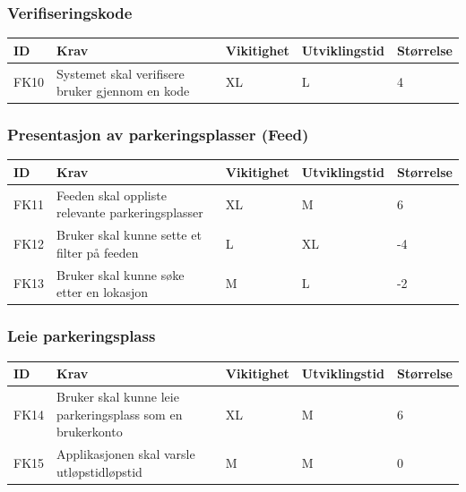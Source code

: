 \documentclass[12pt]{article}
\newcommand{\cellr}{\cellcolor{red!25}}
\newcommand{\cello}{\cellcolor{orange!25}}
\newcommand{\celly}{\cellcolor{yellow!25}}
\newcommand{\cellg}{\cellcolor{green!25}}
\begin{document}
        \subsubsection{Verifiseringskode}
        
        \begin{tabular}{|p{2cm}|p{6cm}|
            >{\centering\arraybackslash}p{2cm}|
            >{\centering\arraybackslash}p{2cm}|
            >{\centering\arraybackslash}p{2cm}|} 
            \hline
            \bf ID & \bf Krav & \bf Vikitighet & \bf Utviklingstid & \bf Størrelse\\
            \hline
            FK10
            &
            Systemet skal verifisere bruker gjennom en kode
            & XL & L & \cellg 4\\
            \hline
        \end{tabular}
        
        \subsubsection{Presentasjon av parkeringsplasser (Feed)}
        
        \begin{tabular}{|p{2cm}|p{6cm}|
            >{\centering\arraybackslash}p{2cm}|
            >{\centering\arraybackslash}p{2cm}|
            >{\centering\arraybackslash}p{2cm}|} 
            \hline
            \bf ID & \bf Krav & \bf Vikitighet & \bf Utviklingstid & \bf Størrelse\\
            \hline
            FK11
            &
            Feeden skal oppliste relevante parkeringsplasser
            & XL & M & \cellg 6\\
            \hline
            FK12
            &
            Bruker skal kunne sette et filter på feeden
            & L & XL & \cellr -4\\
            \hline
            FK13
            &
            Bruker skal kunne søke etter en lokasjon
            & M & L & \cello -2\\
            \hline
        \end{tabular}
        
        \subsubsection{Leie parkeringsplass}
        
        \begin{tabular}{|p{2cm}|p{6cm}|
            >{\centering\arraybackslash}p{2cm}|
            >{\centering\arraybackslash}p{2cm}|
            >{\centering\arraybackslash}p{2cm}|} 
            \hline
            \bf ID & \bf Krav & \bf Vikitighet & \bf Utviklingstid & \bf Størrelse\\
            \hline
            FK14
            &
            Bruker skal kunne leie parkeringsplass som en brukerkonto
            & XL & M & \cellg 6\\
            \hline
            FK15
            &
            Applikasjonen skal varsle utløpstidløpstid
            & M & M & \celly 0\\
            \hline
        \end{tabular}
        
\end{document}
